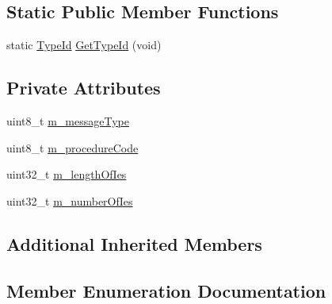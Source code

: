 \subsection*{Static Public Member Functions}
\begin{DoxyCompactItemize}
\item 
static \hyperlink{classns3_1_1TypeId}{Type\+Id} \hyperlink{classns3_1_1EpcX2Header_a89eb49b3b3fa441474e6e0cd8091a7ec}{Get\+Type\+Id} (void)
\end{DoxyCompactItemize}
\subsection*{Private Attributes}
\begin{DoxyCompactItemize}
\item 
uint8\+\_\+t \hyperlink{classns3_1_1EpcX2Header_a399d3a91dcf5d9aaa9a6a38083f5231b}{m\+\_\+message\+Type}
\item 
uint8\+\_\+t \hyperlink{classns3_1_1EpcX2Header_aa3338e5efe68ec1867073059e619fe70}{m\+\_\+procedure\+Code}
\item 
uint32\+\_\+t \hyperlink{classns3_1_1EpcX2Header_ac3a30591bc6975c3d800388b150a3672}{m\+\_\+length\+Of\+Ies}
\item 
uint32\+\_\+t \hyperlink{classns3_1_1EpcX2Header_aa1a12764d7419bd3524b29be156903a2}{m\+\_\+number\+Of\+Ies}
\end{DoxyCompactItemize}
\subsection*{Additional Inherited Members}


\subsection{Member Enumeration Documentation}
